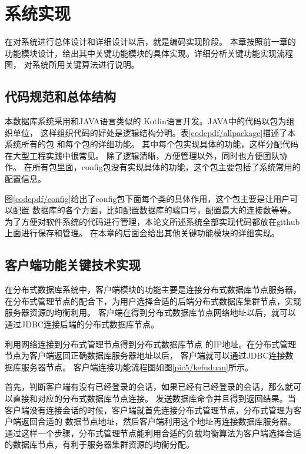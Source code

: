 
\chapter{系统实现}
在对系统进行总体设计和详细设计以后，就是编码实现阶段。
本章按照前一章的功能模块设计，给出其中关键功能模块的具体实现。详细分析关键功能实现流程图，
对系统所用关键算法进行说明。
\section{代码规范和总体结构}
本数据库系统采用和JAVA语言类似的
Kotlin语言开发。JAVA中的代码以包为组织单位，
这样组织代码的好处是逻辑结构分明。表\ref{codepdf/allpackage}描述了本系统所有的包
和每个包的详细功能。
其中每个包实现具体的功能，这样分配代码在大型工程实践中很常见。
除了逻辑清晰，方便管理以外，同时也方便团队协作。
在所有包里面，config包没有实现具体的功能，这个包主要包括了系统常用的配置信息。

图\ref{codepdf/config}给出了config包下面每个类的具体作用，这个包主要是让用户可以配置
数据库的各个方面，比如配置数据库的端口号，配置最大的连接数等等。为了方便对软件系统的代码进行管理，本论文所述系统全部实现代码都放在github上面进行保存和管理。
在本章的后面会给出其他关键功能模块的详细实现。
\section{客户端功能关键技术实现}
在分布式数据库系统中，客户端模块的功能主要是连接分布式数据库节点服务器，在分布式管理节点的配合下，为用户选择合适的后端分布式数据库集群节点，实现服务器资源的均衡利用。
客户端在得到分布式数据库节点网络地址以后，就可以通过JDBC连接后端的分布式数据库节点。

利用网络连接到分布式管理节点得到分布式数据库节点
的IP地址。在分布式管理节点为客户端返回正确数据库服务器地址以后，
客户端就可以通过JDBC连接数据库服务器节点。
客户端连接功能流程图如图\ref{pic5/kefuduan}所示。

首先，判断客户端有没有已经登录的会话，如果已经有已经登录的会话，那么就可以直接和对应的分布式数据库节点连接。
发送数据库命令并且得到返回结果。当客户端没有连接会话的时候，客户端就首先连接分布式管理节点，分布式管理为客户端返回合适的
数据节点地址，然后客户端利用这个地址再连接数据库服务器。
通过这样一个步骤，分布式管理节点能利用合适的负载均衡算法为客户端选择合适的数据库节点，有利于服务器集群资源的均衡分配。
